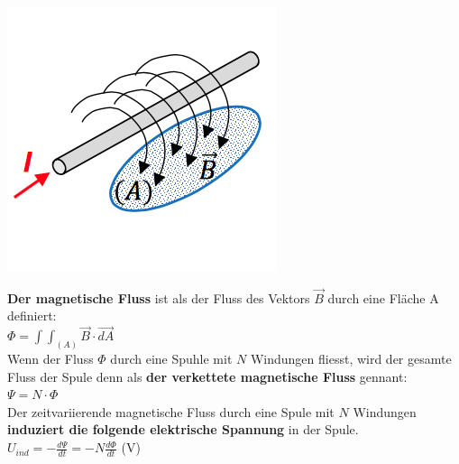 \begin{minipage}{0.2 \linewidth}
    \includegraphics[width =\linewidth]{./Pics/VL1/magFluss}
\end{minipage}
\begin{minipage}{0.8 \linewidth}
\textbf{Der magnetische Fluss} ist als der Fluss des Vektors $\vec{B}$ durch eine Fläche A definiert:\\

$\Phi = \int\int_{(A)} \vec{B} \cdot \vec{dA}$ \\

Wenn der Fluss $ \Phi$ durch eine Spuhle mit $N$ Windungen fliesst, wird der gesamte Fluss der Spule denn als \textbf{der verkettete magnetische Fluss} gennant: \\

$\Psi = N \cdot \Phi$ \\

Der zeitvariierende magnetische Fluss durch eine Spule mit $N$ Windungen \textbf{induziert die folgende elektrische Spannung} in der Spule.\\

$U_{ind} = - \frac{d \Psi}{dt} = -N \frac{d \Phi}{dt}$ (V)
\end{minipage}

